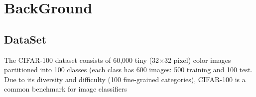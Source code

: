 \chapter{BackGround}

\section{DataSet}

The CIFAR-100 dataset consists of 60,000 tiny (32×32 pixel) color images partitioned into 100 classes (each class has 600 images: 500 training and 100 test. Due to its diversity and difficulty (100 fine-grained categories), CIFAR-100 is a common benchmark for image classifiers